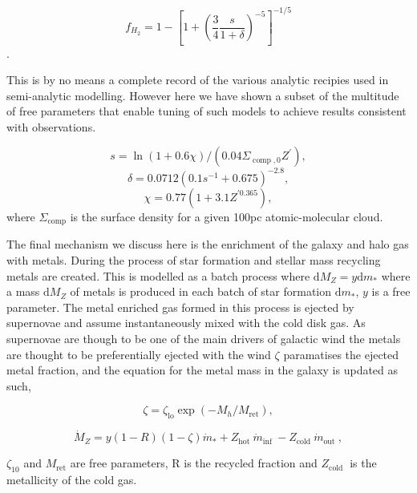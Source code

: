 \begin{equation}
    f_{H_{2}}=1-\left[1+\left(\frac{3}{4} \frac{s}{1+\delta}\right)^{-5}\right]^{-1 / 5}
\end{equation}.

This is by no means a complete record of the various analytic recipies used in semi-analytic modelling. However here we have shown a subset of the multitude of free parameters that enable tuning of such models to achieve results consistent with observations.

\begin{equation}
s=\ln (1+0.6 \chi) /\left(0.04 \Sigma_{\operatorname{comp}, 0} Z^{\prime}\right),
\end{equation}
\begin{equation}
\delta=0.0712\left(0.1 s^{-1}+0.675\right)^{-2.8},
\end{equation}
\begin{equation}
\chi=0.77\left(1+3.1 Z^{\prime0.365}\right),
\end{equation}
where $\Sigma_{\operatorname{comp}}$ is the surface density for a given 100pc atomic-molecular cloud.

The final mechanism we discuss here is the enrichment of the galaxy and halo gas with metals. During the process of star formation and stellar mass recycling metals are created. This is modelled as a batch process where $\mathrm{d} M_{Z}=y \mathrm{d} m_{*}$ where a mass $\mathrm{d} M_{Z}$ of metals is produced in each batch of star formation $\mathrm{d} m_{*}$, $y$ is a free parameter. The metal enriched gas formed in this process is ejected by supernovae and assume instantaneously mixed with the cold disk gas. As supernovae are though to be one of the main drivers of galactic wind the metals are thought to be preferentially ejected with the wind $\zeta$ paramatises the ejected metal fraction, and the equation for the metal mass in the galaxy is updated as such,

\begin{equation}
\zeta=\zeta_{\mathrm{lo}} \exp \left(-M_{h} / M_{\mathrm{ret}}\right),
\end{equation}

\begin{equation}
\dot{M}_{Z}=y(1-R)(1-\zeta) \dot{m}_{*}+Z_{\text {hot }} \dot{m}_{\text {inf }}-Z_{\text {cold }} \dot{m}_{\text {out }},
\end{equation}

$\zeta_{10}$ and $M_{\mathrm{ret}}$ are free parameters, R is the recycled fraction and $Z_{\text {cold }}$ is the metallicity of the cold gas.


